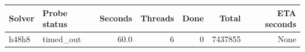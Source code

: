 {\small
\begin{tabular}{llrrrrr}
\hline
Solver & Probe status & Seconds & Threads & Done & Total & ETA seconds \\
\hline
h48h8 & timed\_out & 60.0 & 6 & 0 & 7437855 & None \\
\hline
\end{tabular}
}
